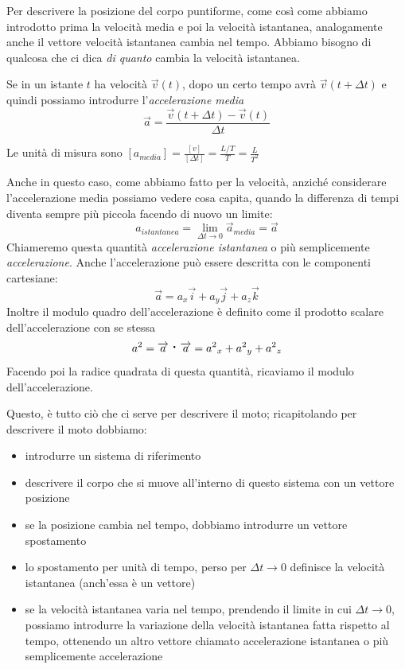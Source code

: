 Per descrivere la posizione del corpo puntiforme, come
così come abbiamo introdotto prima la velocità media e poi la
velocità istantanea, analogamente anche il vettore velocità istantanea
cambia nel tempo. Abbiamo bisogno di qualcosa che ci dica \textit{di quanto}
cambia la velocità istantanea. 


Se in un istante $t$ ha velocità $\overrightarrow{v}(t)$, 
dopo un certo tempo avrà  $\overrightarrow{v}(t +\Delta t)$ e quindi 
possiamo introdurre l'\textit{accelerazione media}
\begin{equation}
    \overrightarrow{a}=
    \frac{\overrightarrow{v}(t +\Delta t) - \overrightarrow{v}(t)}{\Delta t} 
\end{equation}

Le unità di misura sono
 $[a_{media}]=\frac{[v]}{[\Delta t]}= \frac{L/T}{T}=\frac{L}{T^2}$

Anche in questo caso, come abbiamo fatto per la velocità,  anziché considerare l'accelerazione media possiamo vedere cosa capita, quando la differenza di tempi diventa sempre più piccola facendo di nuovo un limite:
$$ a_{istantanea} = \lim_{ \Delta t \to 0} {\overrightarrow{a}_{media} } = \overrightarrow{a}  $$
Chiameremo questa quantità \textit{accelerazione istantanea} o più semplicemente \textit{accelerazione}.
Anche l'accelerazione può essere descritta con le componenti cartesiane:
$$ \overrightarrow{a} = a_{x} \overrightarrow{i} + a_{y} \overrightarrow{j} + a_{z} \overrightarrow{k} $$
Inoltre il modulo quadro dell'accelerazione è definito come il prodotto scalare dell'accelerazione con se stessa
$$ a^{2} = \overrightarrow{a} \prodscal \overrightarrow{a} = {a^{2}}_{x} + {a^{2}}_{y} + {a^{2}}_{z} $$
Facendo poi la radice quadrata di questa quantità, ricaviamo il modulo dell'accelerazione.

Questo, è tutto ciò che ci serve per descrivere il moto; ricapitolando per descrivere il moto dobbiamo:
\begin{itemize}
	\item introdurre un sistema di riferimento
	\item descrivere il corpo che si muove all'interno di questo sistema con un vettore posizione
	\item se la posizione cambia nel tempo, dobbiamo introdurre un vettore spostamento
	\item lo spostamento per unità di tempo, perso per $\Delta t \to 0$ definisce la velocità istantanea (anch'essa è un vettore)
	\item se la velocità istantanea varia nel tempo,  prendendo il limite in cui $\Delta t \to 0$,  possiamo introdurre la variazione della velocità istantanea fatta rispetto al tempo, ottenendo un altro vettore chiamato accelerazione istantanea o più semplicemente accelerazione
\end{itemize}

